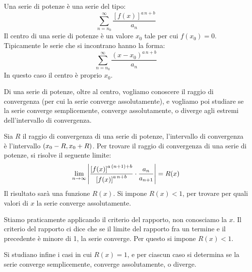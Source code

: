 Una serie di potenze \`e una serie del tipo:
\[
\sum_{n = n_0}^{\infty} \frac{\left[ f(x) \right]^{a \, n + b}}{a_n}
\]
Il centro di una serie di potenze \`e un valore $x_0$ tale per cui
$f(x_0) = 0$. Tipicamente le serie che si incontrano hanno la forma:
\[
\sum_{n = n_0}^{\infty} \frac{\left( x - x_0 \right)^{a \, n + b}}{a_n}
\]
In questo caso il centro \`e proprio $x_0$.

Di una serie di potenze, oltre al centro, vogliamo conoscere il raggio
di convergenza (per cui la serie converge assolutamente), e vogliamo poi
studiare se la serie converge semplicemente, converge assolutamente, o
diverge agli estremi dell'intervallo di convergenza.

Sia $R$ il raggio di convergenza di una serie di potenze, l'intervallo di 
convergenza \`e l'intervallo $\left( {x_0 - R}, {x_0 + R} \right)$. Per trovare il 
raggio di convergenza di una serie di potenze, si risolve il seguente
limite:
\[
\lim_{n \to \infty} \left\lvert{\frac{\left[f(x)\right]^{a \, (n+1) + b}}{\left[f(x)\right]^{{a \, n + b}}} \cdot \frac{a_n}{a_{n+1}}}\right\rvert = R(x)
\]
Il risultato sar\`a una funzione $R(x)$. Si impone $R(x) < 1$, per trovare
per quali valori di $x$ la serie converge assolutamente. 

Stiamo praticamente applicando il criterio del rapporto, non conosciamo la
$x$. Il criterio del rapporto ci dice che se il limite del rapporto fra un 
termine e il precedente \`e minore di 1, la serie converge. Per questo si 
impone $R(x) < 1$.

Si studiano infine i casi in cui $R(x) = 1$, e per ciascun caso si determina
se la serie converge semplicemente, converge assolutamente, o diverge.


